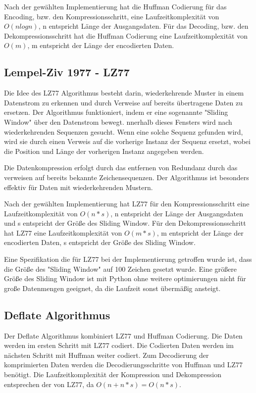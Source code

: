 \documentclass[conference]{IEEEtran}
\begin{document}
Nach der gewählten Implementierung hat
die Huffman Codierung für das Encoding, bzw. den Kompressionsschritt, eine
Laufzeitkomplexität von $O(n log n)$, n entspricht Länge der Ausgangsdaten.
Für das Decoding, bzw. den Dekompressionsschritt hat die Huffman Codierung eine
Laufzeitkomplexität von $O(m)$, m entspricht der Länge der encodierten Daten. \cite{moffat}

\subsection{Lempel-Ziv 1977 - LZ77}

Die Idee des LZ77 Algorithmus besteht darin, wiederkehrende Muster
in einem Datenstrom zu erkennen und durch Verweise auf bereits übertragene Daten zu ersetzen.
Der Algorithmus funktioniert, indem er eine sogenannte "Sliding Window" über den
Datenstrom bewegt.
nnerhalb dieses Fensters wird nach wiederkehrenden Sequenzen gesucht.
Wenn eine solche Sequenz gefunden wird, wird sie durch einen Verweis auf die
vorherige Instanz der Sequenz ersetzt, wobei die Position und Länge der vorherigen Instanz
angegeben werden.

Die Datenkompression erfolgt durch das entfernen von Redundanz durch das verweisen auf bereits
bekannte Zeichensequenzen.
Der Algorithmus ist besonders effektiv für Daten mit wiederkehrenden Mustern.

Nach der gewählten Implementierung hat
LZ77 für den Kompressionsschritt eine Laufzeitkomplexität von
$O(n * s)$, n entspricht der Länge der Ausgangsdaten und s entspricht der
Größe des Sliding Window.
Für den Dekompressionsschritt hat LZ77 eine
Laufzeitkomplexität von $O(m * s)$, m entspricht der Länge der encodierten Daten, s entspricht der
Größe des Sliding Window. \cite{nick}

Eine Spezifikation die für LZ77 bei der Implementierung getroffen wurde ist,
dass die Größe des "Sliding Window" auf 100 Zeichen gesetzt wurde.
Eine größere Größe des Sliding Window ist mit Python ohne
weitere optimierungen nicht für große Datenmengen geeignet, da die Laufzeit
sonst übermäßig ansteigt.

\subsection{Deflate Algorithmus}
\label{deflate}

Der Deflate Algorithmus kombiniert LZ77 und Huffman Codierung.
Die Daten werden im ersten Schritt mit LZ77 codiert.
Die Codierten Daten werden im nächsten Schritt mit Huffman weiter codiert.
Zum Decodierung der komprimierten Daten werden die Decodierungsschritte von Huffman
und LZ77 benötigt.
Die Laufzeitkomplexität der Kompression und Dekompression entsprechen der von
LZ77, da $O(n + n * s) = O(n * s)$.
\end{document}

